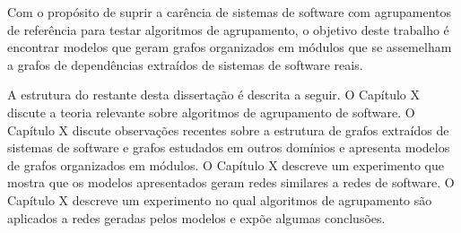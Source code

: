 Com o propósito de suprir a carência de sistemas de software com agrupamentos de referência para testar algoritmos de agrupamento, o objetivo deste trabalho é encontrar modelos que geram grafos organizados em módulos que se assemelham a grafos de dependências extraídos de sistemas de software reais.

A estrutura do restante desta dissertação é descrita a seguir. O Capítulo X discute a teoria relevante sobre algoritmos de agrupamento de software.
O Capítulo X discute observações recentes sobre a estrutura de grafos extraídos de sistemas de software e grafos estudados em outros domínios e apresenta modelos de grafos organizados em módulos. O Capítulo X descreve um experimento que mostra que os modelos apresentados geram redes similares a redes de software. O Capítulo X descreve um experimento no qual algoritmos de agrupamento são aplicados a redes geradas pelos modelos e expõe algumas conclusões. 


